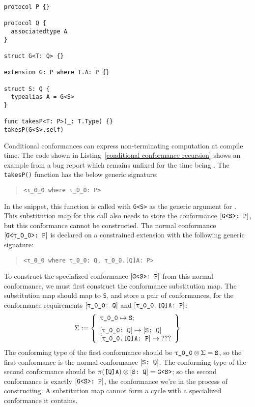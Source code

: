 \documentclass[../generics]{subfiles}
\begin{document}
\begin{listing}[b!]\label{conditional conformance recursion}
\begin{Verbatim}
protocol P {}

protocol Q {
  associatedtype A
}

struct G<T: Q> {}

extension G: P where T.A: P {}

struct S: Q {
  typealias A = G<S>
}

func takesP<T: P>(_: T.Type) {}
takesP(G<S>.self)
\end{Verbatim}
\end{listing}

\begin{example}
Conditional conformances can express non-terminating computation at compile time. 
The code shown in Listing~\ref{conditional conformance recursion} shows an example from a bug report which remains unfixed for the time being \cite{sr6724}. The \texttt{takesP()} function has the below generic signature:
\begin{quote}
\begin{verbatim}
<τ_0_0 where τ_0_0: P>
\end{verbatim}
\end{quote}
In the snippet, this function is called with \texttt{G<S>} as the generic argument for . This substitution map for this call also needs to store the conformance $[\texttt{G<S>:~P}]$, but this conformance cannot be constructed. The normal conformance $[\texttt{G<\texttt{$\uptau$\_0\_0}>:~P}]$ is declared on a constrained extension with the following generic signature:
\begin{quote}
\begin{verbatim}
<τ_0_0 where τ_0_0: Q, τ_0_0.[Q]A: P>
\end{verbatim}
\end{quote}
To construct the specialized conformance $[\texttt{G<S>:~P}]$ from this normal conformance, we must first construct the conformance substitution map. The substitution map should map  to \texttt{S}, and store a pair of conformances, for the conformance requirements $[\texttt{\texttt{$\uptau$\_0\_0}:~Q}]$ and $[\texttt{\texttt{$\uptau$\_0\_0}.[Q]A:~P}]$:
\[\Sigma := \SubstMapLongC{\SubstType{\ttgp{0}{0}}{S}}{
\SubstConf{\ttgp{0}{0}}{S}{Q}\\
\ConfReq{\ttgp{0}{0}.[Q]A}{P}\mapsto\text{???}
}\]
The conforming type of the first conformance should be $\texttt{$\uptau$\_0\_0}\otimes\Sigma=\texttt{S}$, so the first conformance is the normal conformance $[\texttt{S:~Q}]$. The conforming type of the second conformance should be 
$\pi(\texttt{[Q]A})\otimes[\texttt{S:~Q}]=\texttt{G<S>}$; so the second conformance is exactly $[\texttt{G<S>:~P}]$, the conformance we're in the process of constructing. A substitution map cannot form a cycle with a specialized conformance it contains.


\end{example}
\end{document}
